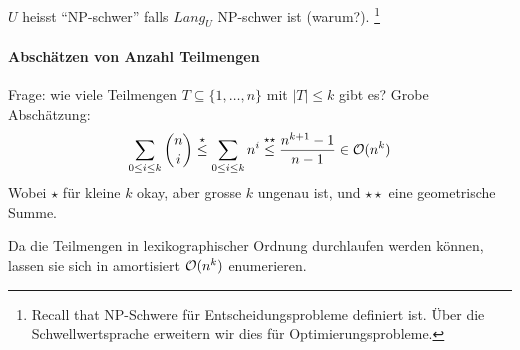$U$ heisst ``NP-schwer'' falls $Lang_U$ NP-schwer ist (warum?).%
\footnote{Recall that NP-Schwere für Entscheidungsprobleme definiert ist.
Über die Schwellwertsprache erweitern wir dies für Optimierungsprobleme.}

\paragraph{Abschätzen von Anzahl Teilmengen}
Frage: wie viele Teilmengen $T \subseteq \{1, \dots, n\}$ mit $|T| \leq k$ gibt es?
Grobe Abschätzung:
$$ \sum_{0 \leq i \leq k} \binom{n}{i}
\overset{\star}{\leq} \sum_{0 \leq i \leq k} n^i
\overset{\star\star}{\leq} \frac{n^{k+1} - 1}{n-1} \in \mathcal{O}(n^k) $$
Wobei $\star$ für kleine $k$ okay, aber grosse $k$ ungenau ist, und $\star\star$ eine geometrische Summe.

Da die Teilmengen in lexikographischer Ordnung durchlaufen werden können, lassen sie sich in amortisiert
$\mathcal{O}(n^k)$ enumerieren.
